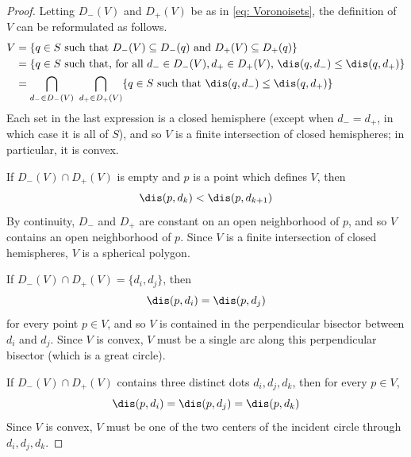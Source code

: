 \documentclass[11pt,oneside]{amsart}
\theoremstyle{definition}
\theoremstyle{remark}
\numberwithin{equation}{section}
\begin{document}
\begin{proof}
Letting $D_-(V)$ and $D_+(V)$ be as in \eqref{eq: Voronoisets}, the definition of $V$ can be reformulated as follows.
\[
\begin{aligned}
V 
&= \{ q\in S \text{ such that $D_-(V)\subseteq D_-(q)$ and $D_+(V)\subseteq D_+(q)$}\}
\\
&= \{ q\in S  \text{ such that, for all $d_-\in D_-(V), d_+\in D_+(V)$, $\dis(q,d_-)\leq \dis(q,d_+)$}\}
\\
&= 
\bigcap_{d_-\in D_-(V)}~ \bigcap_{d_+\in D_+(V)}
\{ q\in S  \text{ such that $\dis(q,d_-)\leq \dis(q,d_+)$}\}
\\
\end{aligned}
\]
Each set in the last expression is a closed hemisphere (except when $d_-=d_+$, in which case it is all of $S$), and so $V$ is a finite intersection of closed hemispheres; in particular, it is convex.

If $D_-(V) \cap D_+(V)$ is empty and $p$ is a point which defines $V$, then 
\[ \dis(p,d_k) < \dis(p,d_{k+1}) \]
By continuity, $D_-$ and $D_+$ are constant on an open neighborhood of $p$, and so $V$ contains an open neighborhood of $p$. Since $V$ is a finite intersection of closed hemispheres, $V$ is a spherical polygon.

If $D_-(V) \cap D_+(V) = \{d_i,d_j\}$, then 
    \[
    \dis(p,d_i)=\dis(p,d_j)
    \]
for every point $p\in V$, and so $V$ is contained in the perpendicular bisector between $d_i$ and $d_j$. Since $V$ is convex, $V$ must be a single arc along this perpendicular bisector (which is a great circle).

If $D_-(V)\cap D_+(V)$ contains three distinct dots $d_i,d_j,d_k$, then for every $p \in V$,
    \[
    \dis(p,d_i)=\dis(p,d_j) = \dis(p,d_k) 
    \]
Since $V$ is convex, $V$ must be one of the two centers of the incident circle through $d_i,d_j,d_k$.%
\end{proof}



\end{document}

